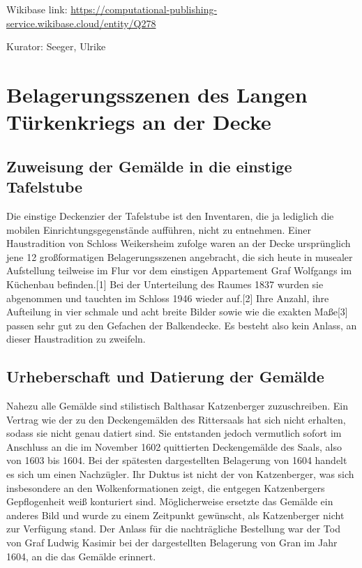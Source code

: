 \documentclass[
  letterpaper,
]{book}
\begin{document}
Wikibase link:
\url{https://computational-publishing-service.wikibase.cloud/entity/Q278}

Kurator: Seeger, Ulrike

\section{Belagerungsszenen des Langen Türkenkriegs an der
Decke}\label{belagerungsszenen-des-langen-tuxfcrkenkriegs-an-der-decke}

\subsection{Zuweisung der Gemälde in die einstige
Tafelstube}\label{zuweisung-der-gemuxe4lde-in-die-einstige-tafelstube}

Die einstige Deckenzier der Tafelstube ist den Inventaren, die ja
lediglich die mobilen Einrichtungsgegenstände aufführen, nicht zu
entnehmen. Einer Haustradition von Schloss Weikersheim zufolge waren an
der Decke ursprünglich jene 12 großformatigen Belagerungsszenen
angebracht, die sich heute in musealer Aufstellung teilweise im Flur vor
dem einstigen Appartement Graf Wolfgangs im Küchenbau befinden.{[}1{]}
Bei der Unterteilung des Raumes 1837 wurden sie abgenommen und tauchten
im Schloss 1946 wieder auf.{[}2{]} Ihre Anzahl, ihre Aufteilung in vier
schmale und acht breite Bilder sowie wie die exakten Maße{[}3{]} passen
sehr gut zu den Gefachen der Balkendecke. Es besteht also kein Anlass,
an dieser Haustradition zu zweifeln.

\subsection{Urheberschaft und Datierung der
Gemälde}\label{urheberschaft-und-datierung-der-gemuxe4lde}

Nahezu alle Gemälde sind stilistisch Balthasar Katzenberger
zuzuschreiben. Ein Vertrag wie der zu den Deckengemälden des Rittersaals
hat sich nicht erhalten, sodass sie nicht genau datiert sind. Sie
entstanden jedoch vermutlich sofort im Anschluss an die im November 1602
quittierten Deckengemälde des Saals, also von 1603 bis 1604. Bei der
spätesten dargestellten Belagerung von 1604 handelt es sich um einen
Nachzügler. Ihr Duktus ist nicht der von Katzenberger, was sich
insbesondere an den Wolkenformationen zeigt, die entgegen Katzenbergers
Gepflogenheit weiß konturiert sind. Möglicherweise ersetzte das Gemälde
ein anderes Bild und wurde zu einem Zeitpunkt gewünscht, als
Katzenberger nicht zur Verfügung stand. Der Anlass für die nachträgliche
Bestellung war der Tod von Graf Ludwig Kasimir bei der dargestellten
Belagerung von Gran im Jahr 1604, an die das Gemälde erinnert.
\end{document}
